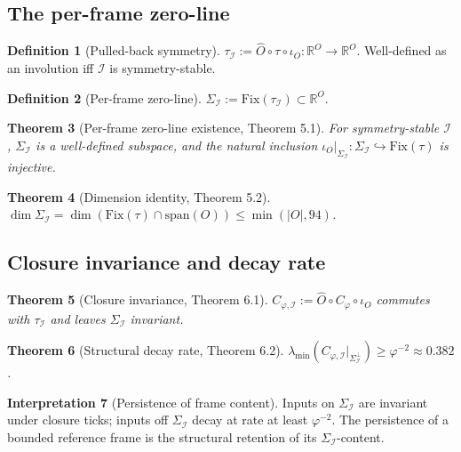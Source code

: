 \documentclass[11pt]{article}
\theoremstyle{plain}
\newtheorem{theorem}{Theorem}[section]
\theoremstyle{definition}
\newtheorem{definition}[theorem]{Definition}
\newtheorem{interpretation}[theorem]{Interpretation}
\theoremstyle{remark}
\newcommand{\Ical}{\mathcal{I}}
\newcommand{\Fix}{\mathrm{Fix}}
\newcommand{\Cph}{C_\varphi}
\begin{document}
\subsection{The per-frame zero-line}

\begin{definition}[Pulled-back symmetry]
$\tau_\Ical := \hat{O} \circ \tau \circ \iota_O : \mathbb{R}^O \to \mathbb{R}^O$. Well-defined as an involution iff $\Ical$ is symmetry-stable.
\end{definition}

\begin{definition}[Per-frame zero-line]\label{def:sigma-frame}
$\Sigma_\Ical := \Fix(\tau_\Ical) \subset \mathbb{R}^O$.
\end{definition}

\begin{theorem}[Per-frame zero-line existence, \citet{PerObserverZeroLine} Theorem 5.1]\label{thm:sigma-frame-existence}
For symmetry-stable $\Ical$, $\Sigma_\Ical$ is a well-defined subspace, and the natural inclusion $\iota_O|_{\Sigma_\Ical}: \Sigma_\Ical \hookrightarrow \Fix(\tau)$ is injective.
\end{theorem}

\begin{theorem}[Dimension identity, \citet{PerObserverZeroLine} Theorem 5.2]\label{thm:sigma-frame-dim}
$\dim \Sigma_\Ical = \dim(\Fix(\tau) \cap \mathrm{span}(O)) \leq \min(|O|, 94)$.
\end{theorem}

\subsection{Closure invariance and decay rate}

\begin{theorem}[Closure invariance, \citet{PerObserverZeroLine} Theorem 6.1]\label{thm:closure-invariance}
$C_{\varphi,\Ical} := \hat{O} \circ \Cph \circ \iota_O$ commutes with $\tau_\Ical$ and leaves $\Sigma_\Ical$ invariant.
\end{theorem}

\begin{theorem}[Structural decay rate, \citet{PerObserverZeroLine} Theorem 6.2]\label{thm:decay}
$\lambda_{\min}(C_{\varphi,\Ical}|_{\Sigma_\Ical^\perp}) \geq \varphi^{-2} \approx 0.382$.
\end{theorem}

\begin{interpretation}[Persistence of frame content]\label{int:persistence}
Inputs on $\Sigma_\Ical$ are invariant under closure ticks; inputs off $\Sigma_\Ical$ decay at rate at least $\varphi^{-2}$. The persistence of a bounded reference frame is the structural retention of its $\Sigma_\Ical$-content.
\end{interpretation}
\end{document}
